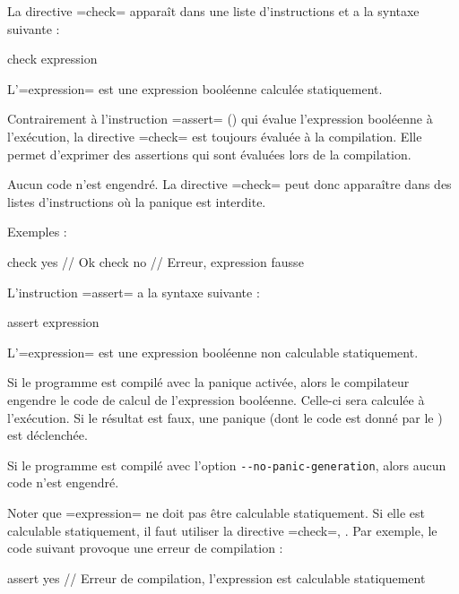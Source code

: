 
La directive \omnibus=check= apparaît dans une liste d'instructions et a la syntaxe suivante :
\begin{OMNIBUS}
check expression
\end{OMNIBUS}

L'\omnibus=expression= est une expression booléenne calculée statiquement.

Contrairement à l'instruction \omnibus=assert= () qui évalue l'expression booléenne à l'exécution, la directive \omnibus=check= est toujours évaluée à la compilation. Elle permet d'exprimer des assertions qui sont évaluées lors de la compilation.

Aucun code n'est engendré. La directive \omnibus=check= peut donc apparaître dans des listes d'instructions où la panique est interdite.

Exemples :
\begin{OMNIBUS}
check yes  // Ok
check no // Erreur, expression fausse
\end{OMNIBUS}




L'instruction \omnibus=assert= a la syntaxe suivante :
\begin{OMNIBUS}
assert expression
\end{OMNIBUS}

L'\omnibus=expression= est une expression booléenne non calculable statiquement.

Si le programme est compilé avec la panique activée, alors le compilateur engendre le code de calcul de l'expression booléenne. Celle-ci sera calculée à l'exécution. Si le résultat est faux, une panique (dont le code est donné par le ) est déclenchée.

Si le programme est compilé avec l'option \texttt{-{}-no-panic-generation}, alors aucun code n'est engendré.

Noter que \omnibus=expression= ne doit pas être calculable statiquement. Si elle est calculable statiquement, il faut utiliser la directive \omnibus=check=, . Par exemple, le code suivant provoque une erreur de compilation :
\begin{OMNIBUS}
assert yes // Erreur de compilation, l'expression est calculable statiquement
\end{OMNIBUS}







